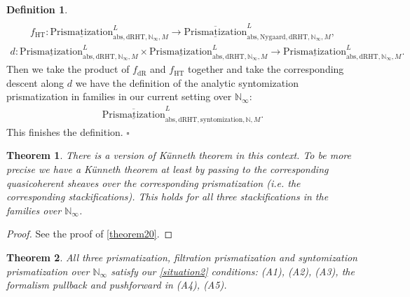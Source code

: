 \documentclass[12pt]{article}
\newtheorem{theorem}{Theorem}
\theoremstyle{definition}
\newtheorem{definition}{Definition}
\begin{document}
\begin{definition}
\begin{align}
\end{align}
\begin{align}
f_\mathrm{HT}: {\underline{\mathrm{Prismatization}}}^L_{\mathrm{abs},\mathrm{dRHT},\mathbb{N}_\infty,M}\rightarrow \overline{\underline{\mathrm{Prismatization}}}^L_{\mathrm{abs},\mathrm{Nygaard},\mathrm{dRHT},\mathbb{N}_\infty,M},
\end{align}
\begin{align}
d:  {\underline{\mathrm{Prismatization}}}^L_{\mathrm{abs},\mathrm{dRHT},\mathbb{N}_\infty,M}\times {\underline{\mathrm{Prismatization}}}^L_{\mathrm{abs},\mathrm{dRHT},\mathbb{N}_\infty,M} \rightarrow {\underline{\mathrm{Prismatization}}}^L_{\mathrm{abs},\mathrm{dRHT},\mathbb{N}_\infty,M}.
\end{align}
Then we take the product of $f_\mathrm{dR}$ and $f_\mathrm{HT}$ together and take the corresponding descent along $d$ we have the definition of the analytic syntomization prismatization in families in our current setting over $\mathbb{N}_\infty$:
\begin{align}
\overline{\underline{\mathrm{Prismatization}}}^L_{\mathrm{abs},\mathrm{dRHT},\mathrm{syntomization},\mathbb{N},M}. 
\end{align}
This finishes the definition. $\square$
\end{definition}

\begin{theorem}
There is a version of K\"unneth theorem in this context. To be more precise we have a K\"unneth theorem at least by passing to the corresponding quasicoherent sheaves over the corresponding prismatization (i.e. the corresponding stackifications). This holds for all three stackifications in the families over $\mathbb{N}_\infty$. 
\end{theorem}

\begin{proof}
See the proof of \cref{theorem20}.
\end{proof}

\begin{theorem}
All three prismatization, filtration prismatization and syntomization prismatization over $\mathbb{N}_\infty$ satisfy our \cref{situation2} conditions: (A1), (A2), (A3), the formalism pullback and pushforward in (A4), (A5).
\end{theorem}
\end{document}
